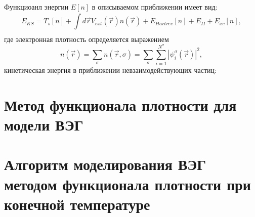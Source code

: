 Функциоанл энергии $E[n]$ в описываемом приближении имеет вид:
\begin{equation}
    \label{eq:dft:E_KS-def}
    E_{KS} = T_{s} [n] + \int\limits_{}^{} d \vec{r} V_{ext} (\vec{r}) n(\vec{r}) + E_{Hartree} [n] + E_{II}  + E_{xc} [n],  
\end{equation}
где электронная плотность определяется выражением
\begin{equation}
    \label{eq:dft:density-kohn}
    n (\vec{r}) = \sum\limits_{\sigma}^{} n(\vec{r}, \sigma) = \sum\limits_{\sigma}^{} \sum\limits_{i=1}^{N^{\sigma} } |\psi_i^{\sigma} (\vec{r})|^2, 
\end{equation}
кинетическая энергия в приближении невзаимодействующих частиц:

\section{Метод функционала плотности для модели ВЭГ}

\section{Алгоритм моделирования ВЭГ методом функционала плотности при конечной температуре}
